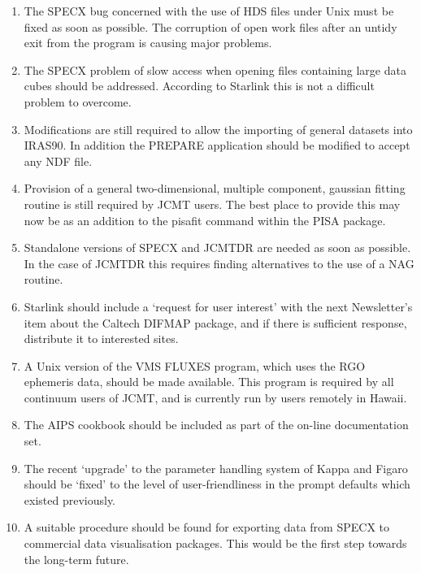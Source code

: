 \begin{enumerate}
\item The SPECX bug concerned with the use of HDS files under Unix must be 
fixed as soon as possible. The corruption of open work files after an
untidy exit from the program is causing major problems.

\item The SPECX problem of slow access when opening files containing large 
data cubes should be addressed. According to Starlink this is not a
difficult problem to overcome.

\item Modifications are still required to allow the importing of
general datasets into IRAS90. In addition the PREPARE application
should be modified to accept any NDF file.

\item Provision of a general two-dimensional, multiple component,
gaussian fitting routine is still required by JCMT users. The best
place to provide this may now be as an addition to the pisafit command
within the PISA package.

\item Standalone versions of SPECX and JCMTDR are needed as soon
as possible. In the case of JCMTDR this requires finding alternatives
to the use of a NAG routine.

\item Starlink should include a `request for user interest' with the 
next Newsletter's item about the Caltech DIFMAP package, and if there
is sufficient response, distribute it to interested sites.

\item A Unix version of the VMS FLUXES program, which uses the RGO
ephemeris data, should be made available. This program is required by
all continuum users of JCMT, and is currently run by users remotely in
Hawaii.

\item The AIPS cookbook should be included as part of the on-line
documentation set.

\item The recent `upgrade' to the parameter handling system of Kappa and
Figaro should be `fixed' to the level of user-friendliness in the
prompt defaults which existed previously.

\item A suitable procedure should be found for exporting data from
SPECX to commercial data visualisation packages. This would be the
first step towards the long-term future.


\end{enumerate}
